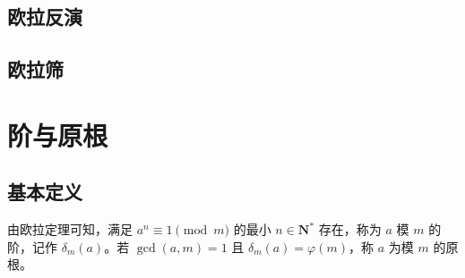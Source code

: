 \documentclass[12pt,a4paper]{article}
\begin{document}
\subsection{欧拉反演}
\subsection{欧拉筛}

\newpage
\section{阶与原根}
\subsection{基本定义}
由欧拉定理可知，满足 $a^n\equiv1\pmod m$ 的最小 $n\in\mathbf{N^*}$ 存在，称为 $a$ 模 $m$ 的阶，记作 $\delta_m(a)$。若 $\gcd(a,m)=1$ 且 $\delta_m(a)=\varphi(m)$，称 $a$ 为模 $m$ 的原根。
\end{document}
